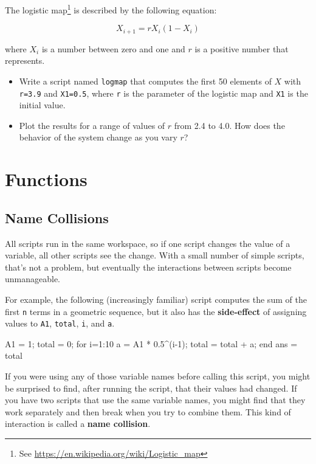 \documentclass[
]{book}
\numberwithin{Answer}{chapter}
\numberwithin{Exercise}{chapter}
\begin{document}
\begin{ex}
The logistic map\footnote{See \url{https://en.wikipedia.org/wiki/Logistic_map}} is described by the following equation:

\begin{equation}
X_{i+1} = r X_i (1-X_i)
\end{equation}

where $X_i$ is a number between zero and one and $r$ is a positive number that represents.

\begin{itemize}

\item Write a script named {\tt logmap} that computes the first 50
elements of $X$ with {\tt r=3.9} and {\tt X1=0.5}, where
{\tt r} is the parameter of the logistic map and {\tt X1} is the
initial value.

\item Plot the results for a range of values of $r$ from 2.4 to 4.0.
How does the behavior of the system change as you vary $r$?

\end{itemize}

\end{ex}


\chapter{Functions}

\section{Name Collisions}

All scripts run in the same workspace, so if one script changes the value of a variable, all other scripts see the change.  With a small number of simple scripts, that's not a problem, but eventually the interactions between
scripts become unmanageable.

For example, the following (increasingly familiar) script computes the
sum of the first {\tt n} terms in a geometric sequence, but it also
has the {\bf side-effect} of assigning values to {\tt A1}, {\tt total},
{\tt i}, and {\tt a}.

\begin{code}
A1 = 1;
total = 0;
for i=1:10
    a = A1 * 0.5^(i-1);
    total = total + a;
end
ans = total
\end{code}

If you were using any of those variable names before calling this
script, you might be surprised to find, after running the script,
that their values had changed.  If you have two scripts that use
the same variable names, you might find that they work separately
and then break when you try to combine them.  This kind of
interaction is called a {\bf name collision}.
\end{document}

